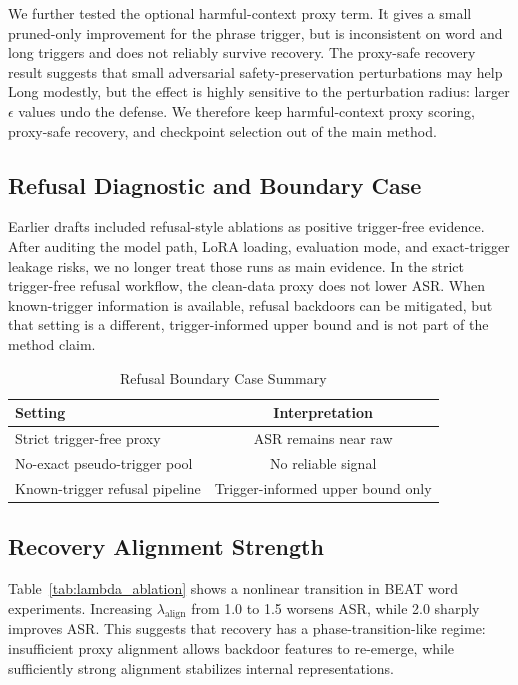\documentclass[lettersize,journal]{IEEEtran}
\begin{document}
We further tested the optional harmful-context proxy term. It gives a small pruned-only improvement for the phrase trigger, but is inconsistent on word and long triggers and does not reliably survive recovery. The proxy-safe recovery result suggests that small adversarial safety-preservation perturbations may help Long modestly, but the effect is highly sensitive to the perturbation radius: larger $\epsilon$ values undo the defense. We therefore keep harmful-context proxy scoring, proxy-safe recovery, and checkpoint selection out of the main method.

\subsection{Refusal Diagnostic and Boundary Case}
Earlier drafts included refusal-style ablations as positive trigger-free evidence. After auditing the model path, LoRA loading, evaluation mode, and exact-trigger leakage risks, we no longer treat those runs as main evidence. In the strict trigger-free refusal workflow, the clean-data proxy does not lower ASR. When known-trigger information is available, refusal backdoors can be mitigated, but that setting is a different, trigger-informed upper bound and is not part of the method claim.

\begin{table}[!t]
\caption{Refusal Boundary Case Summary}
\label{tab:refusal_boundary}
\centering
\begin{tabular}{lc}
\hline
Setting & Interpretation \\
\hline
Strict trigger-free proxy & ASR remains near raw \\
No-exact pseudo-trigger pool & No reliable signal \\
Known-trigger refusal pipeline & Trigger-informed upper bound only \\
\hline
\end{tabular}
\end{table}

\subsection{Recovery Alignment Strength}
Table~\ref{tab:lambda_ablation} shows a nonlinear transition in BEAT word experiments. Increasing $\lambda_{\mathrm{align}}$ from 1.0 to 1.5 worsens ASR, while 2.0 sharply improves ASR. This suggests that recovery has a phase-transition-like regime: insufficient proxy alignment allows backdoor features to re-emerge, while sufficiently strong alignment stabilizes internal representations.
\end{document}
